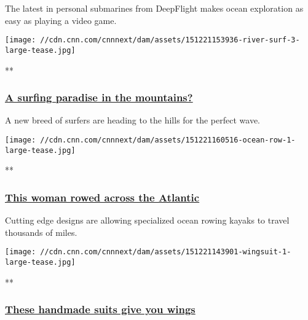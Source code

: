 The latest in personal submarines from DeepFlight makes ocean
exploration as easy as playing a video game.

\href{/videos/us/2015/12/21/orig-river-surfing-standing-waves-montana-rocky-mountains-future-of-adventure.cnn}{}

\texttt{[image: //cdn.cnn.com/cnnnext/dam/assets/151221153936-river-surf-3-large-tease.jpg]}

**

\hypertarget{a-surfing-paradise-in-the-mountains}{%
\subsubsection{\texorpdfstring{\href{/videos/us/2015/12/21/orig-river-surfing-standing-waves-montana-rocky-mountains-future-of-adventure.cnn}{A
surfing paradise in the
mountains?}}{A surfing paradise in the mountains?}}\label{a-surfing-paradise-in-the-mountains}}

A new breed of surfers are heading to the hills for the perfect wave.

\href{/videos/tech/2015/12/21/orig-ocean-rowing-carbon-boat-solar-technology-future-of-adventure.cnn}{}

\texttt{[image: //cdn.cnn.com/cnnnext/dam/assets/151221160516-ocean-row-1-large-tease.jpg]}

**

\hypertarget{this-woman-rowed-across-the-atlantic}{%
\subsubsection{\texorpdfstring{\href{/videos/tech/2015/12/21/orig-ocean-rowing-carbon-boat-solar-technology-future-of-adventure.cnn}{This
woman rowed across the
Atlantic}}{This woman rowed across the Atlantic}}\label{this-woman-rowed-across-the-atlantic}}

Cutting edge designs are allowing specialized ocean rowing kayaks to
travel thousands of miles.

\href{/videos/us/2015/12/21/orig-wingsuit-tailor-tony-uragallo-future-of-adventure.cnn}{}

\texttt{[image: //cdn.cnn.com/cnnnext/dam/assets/151221143901-wingsuit-1-large-tease.jpg]}

**

\hypertarget{these-handmade-suits-give-you-wings}{%
\subsubsection{\texorpdfstring{\href{/videos/us/2015/12/21/orig-wingsuit-tailor-tony-uragallo-future-of-adventure.cnn}{These
handmade suits give you
wings}}{These handmade suits give you wings}}\label{these-handmade-suits-give-you-wings}}

